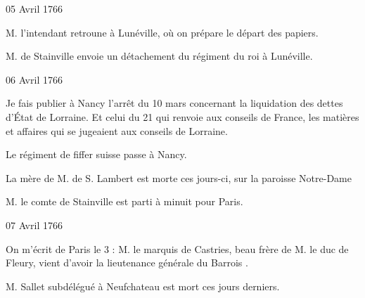                      \begin{diary}{05 Avril 1766}{}


                           M. l'intendant retroune à
                              Lunéville, où
                           on prépare le départ des papiers. \bigskip



                           M. de Stainville
                           envoie un détachement du régiment du roi à Lunéville. \bigskip


                     \end{diary}

                     \begin{diary}{06 Avril 1766}{}

                         Je fais publier à Nancy l'arrêt du
                           10 mars concernant la liquidation
                           des dettes d’État de Lorraine. Et celui du
                           21 qui renvoie aux conseils de France,
                           les matières et affaires qui se jugeaient
                           aux conseils de Lorraine. \bigskip


                         Le régiment de fiffer suisse passe à Nancy. \bigskip



                           La mère de M. de S. Lambert
                           est morte ces jours-ci, sur
                              la paroisse Notre-Dame
                        \bigskip



                           M. le comte de Stainville est
                           parti à
                           minuit pour Paris. \bigskip


                     \end{diary}

                     \begin{diary}{07 Avril 1766}{}

                         On m'écrit de Paris
                           le 3 : \og M. le marquis de
                                 Castries, beau frère de M. le duc de Fleury,
                              vient d'avoir la lieutenance générale du
                              Barrois \fg{}. \bigskip



                           M. Sallet
                           subdélégué à Neufchateau est
                           mort ces jours derniers. \bigskip


                     \end{diary}

